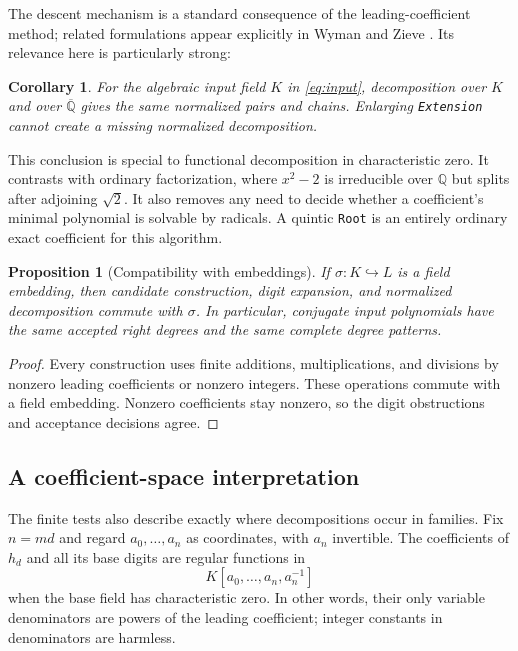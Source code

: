 \documentclass[11pt,a4paper]{article}
\numberwithin{equation}{section}
\newtheorem{proposition}[theorem]{Proposition}
\newtheorem{corollary}[theorem]{Corollary}
\theoremstyle{definition}
\theoremstyle{remark}
\newcommand{\Q}{\mathbb{Q}}
\newcommand{\Qbar}{\overline{\mathbb{Q}}}
\newcommand{\code}[1]{\texttt{#1}}
\begin{document}
The descent mechanism is a standard consequence of the leading-coefficient
method; related formulations appear explicitly in Wyman and Zieve
\cite{WZ}. Its relevance here is particularly strong:
\begin{corollary}
For the algebraic input field $K$ in \eqref{eq:input}, decomposition over $K$
and over $\Qbar$ gives the same normalized pairs and chains. Enlarging
\code{Extension} cannot create a missing normalized decomposition.
\end{corollary}

This conclusion is special to functional decomposition in characteristic
zero. It contrasts with ordinary factorization, where $x^2-2$ is irreducible
over $\Q$ but splits after adjoining $\sqrt2$. It also removes any need to
decide whether a coefficient's minimal polynomial is solvable by radicals.
A quintic \code{Root} is an entirely ordinary exact coefficient for this
algorithm.

\begin{proposition}[Compatibility with embeddings]
If $\sigma:K\hookrightarrow L$ is a field embedding, then candidate
construction, digit expansion, and normalized decomposition commute with
$\sigma$. In particular, conjugate input polynomials have the same accepted
right degrees and the same complete degree patterns.
\end{proposition}
\begin{proof}
Every construction uses finite additions, multiplications, and divisions by
nonzero leading coefficients or nonzero integers. These operations commute
with a field embedding. Nonzero coefficients stay nonzero, so the digit
obstructions and acceptance decisions agree.
\end{proof}

\subsection{A coefficient-space interpretation}
The finite tests also describe exactly where decompositions occur in families.
Fix $n=md$ and regard $a_0,\ldots,a_n$ as coordinates, with $a_n$ invertible.
The coefficients of $h_d$ and all its base digits are regular functions in
\[
 K[a_0,\ldots,a_n,a_n^{-1}]
\]
when the base field has characteristic zero. In other words, their only
variable denominators are powers of the leading coefficient; integer
constants in denominators are harmless.
\end{document}
